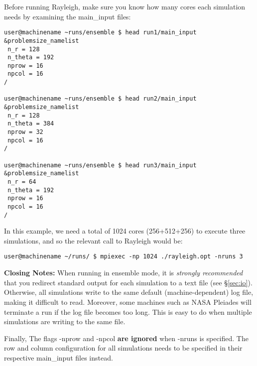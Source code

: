 Before running Rayleigh, make sure you know how many cores each simulation needs by examining the main\_input files:

\begin{lstlisting}
user@machinename ~runs/ensemble $ head run1/main_input 
&problemsize_namelist
 n_r = 128
 n_theta = 192
 nprow = 16
 npcol = 16
/

user@machinename ~runs/ensemble $ head run2/main_input 
&problemsize_namelist
 n_r = 128
 n_theta = 384
 nprow = 32
 npcol = 16
/

user@machinename ~runs/ensemble $ head run3/main_input 
&problemsize_namelist
 n_r = 64
 n_theta = 192
 nprow = 16
 npcol = 16
/
\end{lstlisting}

In this example, we need a total of 1024 cores (256+512+256) to execute three simulations, and so the relevant call to Rayleigh would be:
\begin{lstlisting}
user@machinename ~/runs/ $ mpiexec -np 1024 ./rayleigh.opt -nruns 3
\end{lstlisting}

\textbf{Closing Notes:}
When running in ensemble mode, it is \textit{strongly recommended} that you redirect standard output for each simulation to a text file (see \S \ref{sec:io}).   Otherwise, all simulations write to the same default (machine-dependent) log file, making it difficult to read.  Moreover, some machines such as NASA Pleiades will terminate a run if the log file becomes too long.  This is easy to do when multiple simulations are writing to the same file.

Finally, The flags -nprow and -npcol \textbf{are ignored} when -nruns is specified.  The row and column configuration for all simulations needs to be specified in their respective main\_input files instead.

